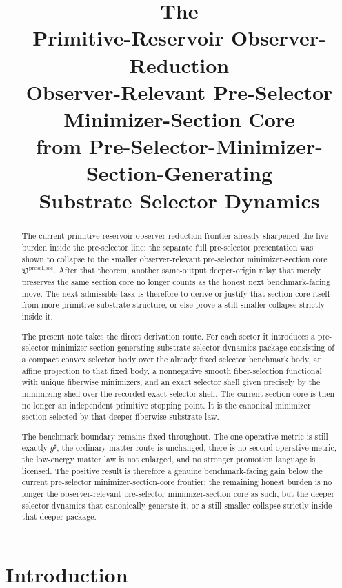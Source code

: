 \documentclass[11pt]{article}
\title{\textbf{The \TheoryName{}}\\[0.4em]
\large Primitive-Reservoir Observer-Reduction\\
\large Observer-Relevant Pre-Selector Minimizer-Section Core\\
\large from Pre-Selector-Minimizer-Section-Generating\\
\large Substrate Selector Dynamics}
\author{}
\date{}
\newcommand{\CompletedMetric}{g^{\sharp}}
\newcommand{\PreSelectorMinSectionCore}{\mathfrak D^{\mathrm{presel,sec}}}
\begin{document}
\maketitle

\begin{abstract}
The current primitive-reservoir observer-reduction frontier already sharpened the live burden inside the pre-selector line: the separate full pre-selector presentation was shown to collapse to the smaller observer-relevant pre-selector minimizer-section core \(\PreSelectorMinSectionCore\). After that theorem, another same-output deeper-origin relay that merely preserves the same section core no longer counts as the honest next benchmark-facing move. The next admissible task is therefore to derive or justify that section core itself from more primitive substrate structure, or else prove a still smaller collapse strictly inside it.

The present note takes the direct derivation route. For each sector it introduces a pre-selector-minimizer-section-generating substrate selector dynamics package consisting of a compact convex selector body over the already fixed selector benchmark body, an affine projection to that fixed body, a nonnegative smooth fiber-selection functional with unique fiberwise minimizers, and an exact selector shell given precisely by the minimizing shell over the recorded exact selector shell. The current section core is then no longer an independent primitive stopping point. It is the canonical minimizer section selected by that deeper fiberwise substrate law.

The benchmark boundary remains fixed throughout. The one operative metric is still exactly \(\CompletedMetric\), the ordinary matter route is unchanged, there is no second operative metric, the low-energy matter law is not enlarged, and no stronger promotion language is licensed. The positive result is therefore a genuine benchmark-facing gain below the current pre-selector minimizer-section-core frontier: the remaining honest burden is no longer the observer-relevant pre-selector minimizer-section core as such, but the deeper selector dynamics that canonically generate it, or a still smaller collapse strictly inside that deeper package.
\end{abstract}

\section{Introduction}
\end{document}
